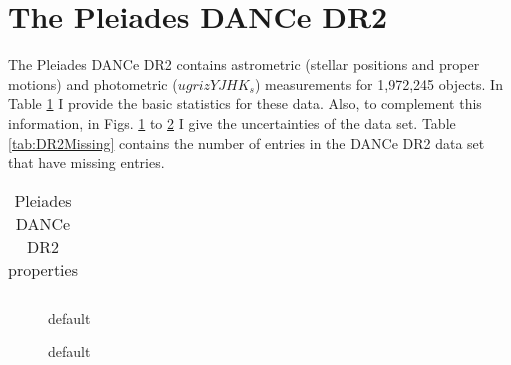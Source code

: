 %

\section{The Pleiades DANCe DR2}
\label{sect:DR2}

The Pleiades DANCe DR2 contains astrometric (stellar positions and proper motions) and photometric ($ugrizYJHK_s$) measurements for 1,972,245 objects. In Table \ref{tab:DR2properties} I provide the basic statistics for these data. Also, to complement this information, in Figs. \ref{fig:pmuncert} to \ref{fig:maguncert} I give the uncertainties of the data set. Table \ref{tab:DR2Missing} contains the number of entries in the DANCe DR2 data set that have missing entries.

\begin{table}[htdp]
\caption{Pleiades DANCe DR2 properties}
\begin{center}
\begin{tabular}{|c|c|}

\end{tabular}
\end{center}
\label{tab:DR2properties}
\end{table}%

\begin{figure}[htbp]
\begin{center}
\caption{default}
\label{fig:pmuncert}
\end{center}
\end{figure}

\begin{figure}[htbp]
\begin{center}
\caption{default}
\label{fig:maguncert}
\end{center}
\end{figure}

